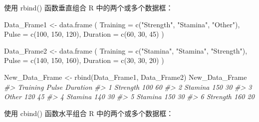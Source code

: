 \documentclass[
]{book}
\newenvironment{Shaded}{\begin{snugshade}}{\end{snugshade}}
\newcommand{\AttributeTok}[1]{\textcolor[rgb]{0.77,0.63,0.00}{#1}}
\newcommand{\CommentTok}[1]{\textcolor[rgb]{0.56,0.35,0.01}{\textit{#1}}}
\newcommand{\DecValTok}[1]{\textcolor[rgb]{0.00,0.00,0.81}{#1}}
\newcommand{\FunctionTok}[1]{\textcolor[rgb]{0.00,0.00,0.00}{#1}}
\newcommand{\NormalTok}[1]{#1}
\newcommand{\OtherTok}[1]{\textcolor[rgb]{0.56,0.35,0.01}{#1}}
\newcommand{\StringTok}[1]{\textcolor[rgb]{0.31,0.60,0.02}{#1}}
\begin{document}
使用 rbind() 函数垂直组合 R 中的两个或多个数据框：

\begin{Shaded}
\begin{Highlighting}[]
\NormalTok{Data\_Frame1 }\OtherTok{\textless{}{-}} \FunctionTok{data.frame}\NormalTok{ (}
  \AttributeTok{Training =} \FunctionTok{c}\NormalTok{(}\StringTok{"Strength"}\NormalTok{, }\StringTok{"Stamina"}\NormalTok{, }\StringTok{"Other"}\NormalTok{),}
  \AttributeTok{Pulse =} \FunctionTok{c}\NormalTok{(}\DecValTok{100}\NormalTok{, }\DecValTok{150}\NormalTok{, }\DecValTok{120}\NormalTok{),}
  \AttributeTok{Duration =} \FunctionTok{c}\NormalTok{(}\DecValTok{60}\NormalTok{, }\DecValTok{30}\NormalTok{, }\DecValTok{45}\NormalTok{)}
\NormalTok{)}

\NormalTok{Data\_Frame2 }\OtherTok{\textless{}{-}} \FunctionTok{data.frame}\NormalTok{ (}
  \AttributeTok{Training =} \FunctionTok{c}\NormalTok{(}\StringTok{"Stamina"}\NormalTok{, }\StringTok{"Stamina"}\NormalTok{, }\StringTok{"Strength"}\NormalTok{),}
  \AttributeTok{Pulse =} \FunctionTok{c}\NormalTok{(}\DecValTok{140}\NormalTok{, }\DecValTok{150}\NormalTok{, }\DecValTok{160}\NormalTok{),}
  \AttributeTok{Duration =} \FunctionTok{c}\NormalTok{(}\DecValTok{30}\NormalTok{, }\DecValTok{30}\NormalTok{, }\DecValTok{20}\NormalTok{)}
\NormalTok{)}

\NormalTok{New\_Data\_Frame }\OtherTok{\textless{}{-}} \FunctionTok{rbind}\NormalTok{(Data\_Frame1, Data\_Frame2)}
\NormalTok{New\_Data\_Frame}
\CommentTok{\#\textgreater{}   Training Pulse Duration}
\CommentTok{\#\textgreater{} 1 Strength   100       60}
\CommentTok{\#\textgreater{} 2  Stamina   150       30}
\CommentTok{\#\textgreater{} 3    Other   120       45}
\CommentTok{\#\textgreater{} 4  Stamina   140       30}
\CommentTok{\#\textgreater{} 5  Stamina   150       30}
\CommentTok{\#\textgreater{} 6 Strength   160       20}
\end{Highlighting}
\end{Shaded}

使用 cbind() 函数水平组合 R 中的两个或多个数据框：
\end{document}
